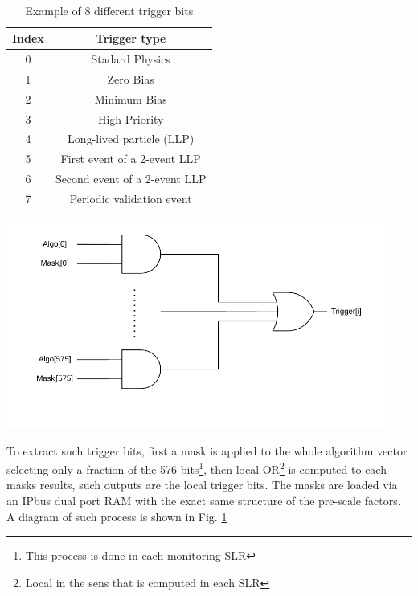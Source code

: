 \documentclass[../../main.tex]{subfiles}
\begin{document}
\begin{table}[ht] \
  \begin{minipage}[b]{0.5\linewidth}
    \centering
    \begin{tabular}{|c|c|}
    \hline
    Index & Trigger type      \\
    \hline
    0 & Stadard Physics     \\
    1 & Zero Bias           \\
    2 & Minimum Bias            \\
    3 & High Priority       \\
    4 & Long-lived particle (LLP)    \\
    5 & First event of a 2-event LLP   \\
    6 & Second event of a 2-event LLP  \\
    7 & Periodic validation event      \\
    \hline
    \end{tabular}
    \caption{Example of 8 different trigger bits}
    \label{tab:trigger_types}
    \vspace{4ex}
  \end{minipage}%
  \begin{minipage}[b]{0.5\linewidth}
    \centering
    \includegraphics[width=0.95\textwidth]{sections/06/Images/TriggerMasks.pdf}
    \label{fig:TriggMasks}
    \vspace{4ex}
  \end{minipage} 
\end{table}

To extract such trigger bits, first a mask is applied to the whole algorithm vector selecting only a fraction of the 576 bits\footnote{This process is done in each monitoring SLR}, then local OR\footnote{Local in the sens that is computed in each SLR} is computed to each masks results, such outputs are the local trigger bits. The masks are loaded via an IPbus dual port RAM with the exact same structure of the pre-scale factors. A diagram of such process is shown in Fig. \ref{fig:TriggMasks}
\end{document}
